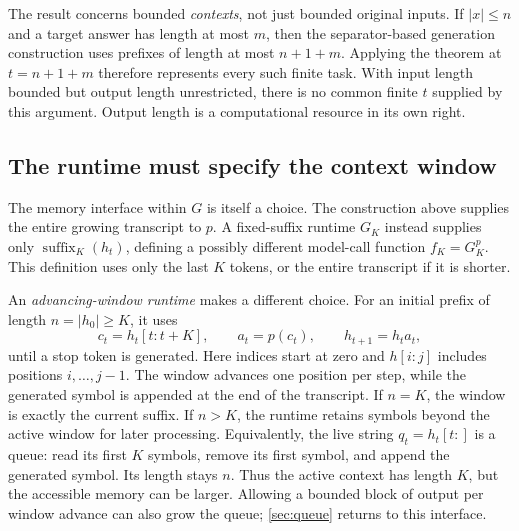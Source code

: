 \documentclass[11pt,twoside]{article}
\theoremstyle{definition}
\theoremstyle{remark}
\begin{document}
The result concerns bounded \emph{contexts}, not just bounded original
inputs. If $|x|\leq n$ and a target answer has length at most $m$, then
the separator-based generation construction uses prefixes of length at
most $n+1+m$. Applying the theorem at $t=n+1+m$ therefore represents every
such finite task. With input length bounded but output length unrestricted,
there is no common finite $t$ supplied by this argument. Output length is
a computational resource in its own right.

\subsection{The runtime must specify the context window}

The memory interface within $G$ is itself a choice. The construction above
supplies the entire growing transcript to $p$. A fixed-suffix runtime
$G_K$ instead supplies only $\operatorname{suffix}_K(h_t)$, defining a
possibly different model-call function $f_K=G_K^p$. This definition uses
only the last $K$ tokens, or the entire transcript if it is shorter.

An \emph{advancing-window runtime} makes a different choice. For an initial
prefix of length $n=|h_0|\geq K$, it uses
\begin{equation}
 c_t=h_t[t:t+K],\qquad a_t=p(c_t),\qquad h_{t+1}=h_ta_t,
 \label{eq:advancing-window}
\end{equation}
until a stop token is generated. Here indices start at zero and $h[i:j]$
includes positions $i,\ldots,j-1$. The window advances one position per
step, while the generated symbol is appended at the end of the transcript.
If $n=K$, the window is exactly the current suffix. If $n>K$, the runtime
retains symbols beyond the active window for later processing. Equivalently,
the live string $q_t=h_t[t:]$ is a queue: read its first $K$ symbols, remove
its first symbol, and append the generated symbol. Its length stays $n$.
Thus the active context has length $K$, but the accessible memory can be
larger. Allowing a bounded block of output per window advance can also grow
the queue; \cref{sec:queue} returns to this interface.
\end{document}
